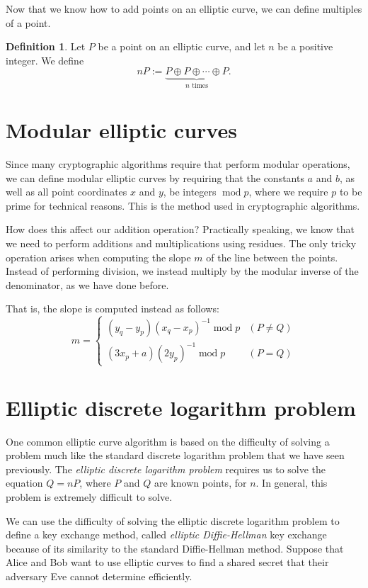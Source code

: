 \documentclass{book}
\theoremstyle{plain}
\theoremstyle{definition}
\newtheorem{definition}[theorem]{Definition}
\renewcommand{\mod}{\operatorname{mod}}
\renewcommand{\mod}{\operatorname{mod}}
\begin{document}
Now that we know how to add points on an elliptic curve, we can define multiples of a point.

\begin{definition}
Let $P$ be a point on an elliptic curve, and let $n$ be a positive integer. We define $$nP := \underbrace{P \oplus P \oplus \cdots \oplus P}_{n \text{ times}}.$$
\end{definition}

\section{Modular elliptic curves}
Since many cryptographic algorithms require that perform modular operations, we can define modular elliptic curves by requiring that the constants $a$ and $b$, as well as all point coordinates $x$ and $y$, be integers $\mod p$, where we require $p$ to be prime for technical reasons. This is the method used in cryptographic algorithms.

How does this affect our addition operation? Practically speaking, we know that we need to perform additions and multiplications using residues. The only tricky operation arises when computing the slope $m$ of the line between the points. Instead of performing division, we instead multiply by the modular inverse of the denominator, as we have done before.

That is, the slope is computed instead as follows:
\begin{equation*}
m = \left\{\begin{array}{ll}
(y_q-y_p)(x_q-x_p)^{-1} \mod p & (P \neq Q) \\
(3x_p+a)(2y_p)^{-1} \mod p & (P = Q)
\end{array}\right.
\end{equation*}


\section{Elliptic discrete logarithm problem}
One common elliptic curve algorithm is based on the difficulty of solving a problem much like the standard discrete logarithm problem that we have seen previously. The {\it elliptic discrete logarithm problem} requires us to solve the equation $Q = nP$, where $P$ and $Q$ are known points, for $n$. In general, this problem is extremely difficult to solve.

We can use the difficulty of solving the elliptic discrete logarithm problem to define a key exchange method, called {\it elliptic Diffie-Hellman} key exchange because of its similarity to the standard Diffie-Hellman method. Suppose that Alice and Bob want to use elliptic curves to find a shared secret that their adversary Eve cannot determine efficiently.
\end{document}
